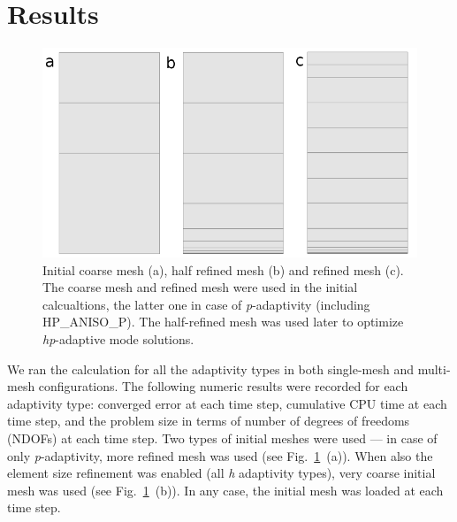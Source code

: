 \section{Results}

\begin{figure}
  \begin{centering}
  \includegraphics[width=.8\columnwidth]{mesh}
  \caption{\label{fig:mesh} Initial coarse mesh (a),
  	half refined mesh (b) and refined mesh (c). The coarse mesh
	and refined mesh were used in the initial calcualtions, the latter one
	in case of \emph{p}-adaptivity (including HP\_ANISO\_P). The half-refined mesh was
	used later to optimize \emph{hp}-adaptive mode solutions.}
  \end{centering}
\end{figure}
We ran the calculation for all the adaptivity types 
in both single-mesh and multi-mesh configurations. 
The following numeric results were recorded for each 
adaptivity type: converged error at each time step, cumulative CPU
time at each time step, and the problem size in terms of number
of degrees of freedoms (NDOFs) at each time step.  
Two types of initial meshes were used --- in case of only \emph{p}-adaptivity,
more refined mesh was used (see Fig.~\ref{fig:mesh}~(a)).
When also the element size refinement
was enabled (all \emph{h} adaptivity types), very coarse initial mesh
was used (see Fig.~\ref{fig:mesh}~(b)). 
In any case, the initial mesh was loaded at each time step.

